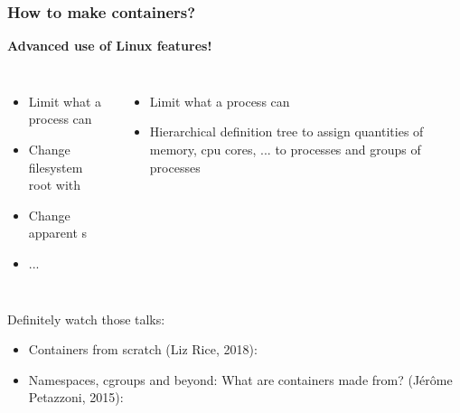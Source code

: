 \begin{frame}
	\frametitle{How to make containers?}
	\centering
	\textbf{Advanced use of Linux features!}
	\vspace{.5cm}\begin{columns}
			\begin{itemize}
				\item Limit what a process can 
				\item Change filesystem root with 
				\item Change apparent s
				\item ...
			\end{itemize}
			\begin{itemize}
				\item Limit what a process can 
				\item Hierarchical definition tree to assign quantities of memory, cpu cores, ... to processes and groups of processes
			\end{itemize}
	\end{columns}
	
	\centering
	\vspace{.5cm}Definitely watch those talks:
	\small
	\begin{itemize}
		\item Containers from scratch (Liz Rice, 2018): 
		\item Namespaces, cgroups and beyond: What are containers made from? (Jérôme Petazzoni, 2015): 
	\end{itemize}
	
	
\end{frame}

